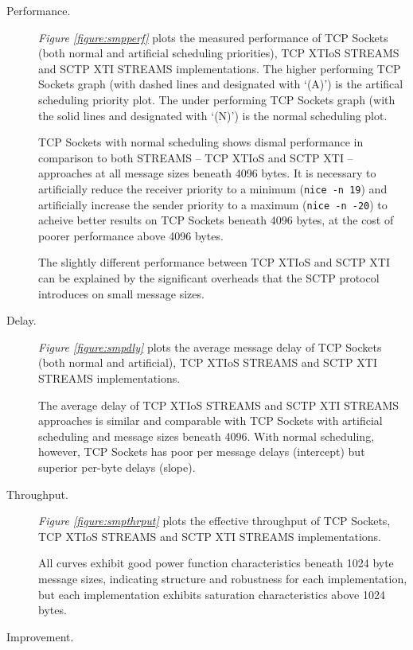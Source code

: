 \documentclass[letterpaper,final,notitlepage,twocolumn,10pt,twoside]{article}
\begin{document}
\begin{description}

\item[Performance.]

\textit{Figure \ref{figure:smpperf}}
plots the measured performance of TCP Sockets (both normal and artificial scheduling priorities),
TCP XTIoS STREAMS and SCTP XTI STREAMS implementations.
The higher performing TCP Sockets graph (with dashed lines and designated with `(A)') is the
artifical scheduling priority plot.  The under performing TCP Sockets graph (with the solid lines
and designated with `(N)') is the normal scheduling plot.

TCP Sockets with normal scheduling shows dismal performance in comparison to both STREAMS -- TCP
XTIoS and SCTP XTI -- approaches at all message sizes beneath 4096 bytes.  It is necessary to
artificially reduce the receiver priority to a minimum (\texttt{nice -n 19}) and artificially
increase the sender priority to a maximum (\texttt{nice -n -20}) to acheive better results on TCP
Sockets beneath 4096 bytes, at the cost of poorer performance above 4096 bytes.

The slightly different performance between TCP XTIoS and SCTP XTI can be explained by the
significant overheads that the SCTP protocol introduces on small message sizes.

\item[Delay.]

\textit{Figure \ref{figure:smpdly}}
plots the average message delay of TCP Sockets (both normal and artificial), TCP XTIoS STREAMS and
SCTP XTI STREAMS implementations.

The average delay of TCP XTIoS STREAMS and SCTP XTI STREAMS approaches is similar and comparable
with TCP Sockets with artificial scheduling and message sizes beneath 4096.  With normal scheduling,
however, TCP Sockets has poor per message delays (intercept) but superior per-byte delays (slope).

\item[Throughput.]

\textit{Figure \ref{figure:smpthrput}}
plots the effective throughput of TCP Sockets, TCP XTIoS STREAMS and SCTP XTI STREAMS
implementations.

All curves exhibit good power function characteristics beneath 1024 byte message sizes, indicating
structure and robustness for each implementation, but each implementation exhibits saturation
characteristics above 1024 bytes.

\item[Improvement.]


\end{description}
\end{document}
